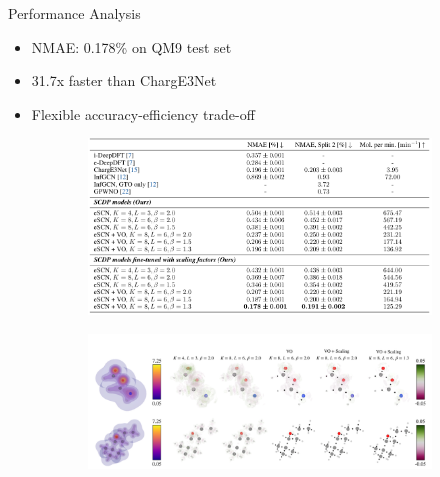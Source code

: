 \begin{frame}{Performance Analysis}
    \begin{itemize}
        \item NMAE: 0.178\% on QM9 test set
        \item 31.7x faster than ChargE3Net
        \item Flexible accuracy-efficiency trade-off
    \end{itemize}
    \begin{figure}
        \begin{subfigure}{0.48\textwidth}
        \includegraphics[width=\textwidth]{figures/scdp_2.jpg}
    \end{subfigure}
    \begin{subfigure}{0.48\textwidth}
        \includegraphics[width=\textwidth]{figures/scdp_1.jpg}
    \end{subfigure}
    \end{figure}
\end{frame}
